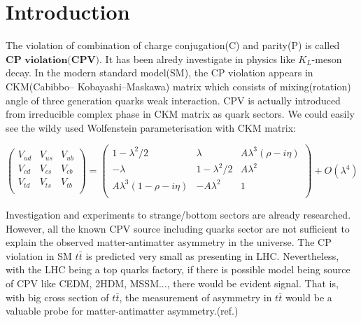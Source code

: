 

\section{Introduction}
\label{sec:Introduction}

	The violation of combination of charge conjugation(C) and parity(P) is called $\textbf{CP}$ $\textbf{violation}$$\textbf{(CPV)}$. It has been alredy investigate in physics like $K_L$-meson decay. In the modern standard model(SM), the CP violation appears in CKM(Cabibbo– Kobayashi–Maskawa) matrix which consists of mixing(rotation) angle of three generation quarks weak interaction. CPV is actually introduced from irreducible complex phase in CKM matrix as quark sectors. We could easily see the wildy used Wolfenstein parameterisation with CKM matrix:

	\begin{equation}
  		\begin{pmatrix}
  		V_{ud} & V_{us} & V_{ub} \\
  		V_{cd} & V_{cs} & V_{cb} \\
  		V_{td} & V_{ts} & V_{tb} \\
  		\end{pmatrix}
  		=
  		\begin{pmatrix}
  		1 - \lambda^2/2 & \lambda & A \lambda^3(\rho -i \eta) \\
  		-\lambda & 1 - \lambda^2/2 & A \lambda^2 \\
  		A \lambda^3(1 - \rho -i \eta) & - A \lambda^2 & 1 \\
  		\end{pmatrix} 
  		+ O(\lambda^4)
	\end{equation}

	Investigation and experiments to strange/bottom sectors are already researched. However, all the known CPV source including quarks sector are not sufficient to explain the observed matter-antimatter asymmetry in the universe. The CP violation in SM $t\bar{t}$ is predicted very small as presenting in LHC. Nevertheless, with the LHC being a top quarks factory, if there is possible model being source of CPV like CEDM, 2HDM, MSSM..., there would be evident signal. That is, with big cross section of $t\bar{t}$, the measurement of asymmetry in $t\bar{t}$ would be a valuable probe for matter-antimatter asymmetry.(ref.\cite{Olive_2014})

